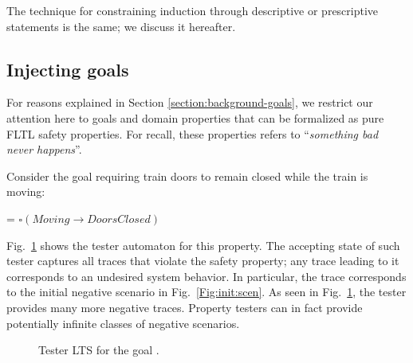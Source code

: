 The technique for constraining induction through descriptive or prescriptive statements is the same; we discuss it hereafter.


\subsection{Injecting goals\label{subsection:induction-pruning-with-goals}}

For reasons explained in Section \ref{section:background-goals}, we restrict our attention here to goals and domain properties that can be formalized as pure FLTL safety properties. For recall, these properties refers to  ``\emph{something bad never happens}''.

Consider the goal requiring train doors to remain closed while the train is moving:
\begin{center}
 = $\square(Moving \rightarrow DoorsClosed)$
\end{center}

Fig.~\ref{Fig.:tester-automaton-inductive} shows the tester automaton for this property. The accepting state of such tester captures all traces that violate the safety property; any trace leading to it corresponds to an undesired system behavior. In particular, the trace  corresponds to the initial negative scenario in Fig.~\ref{Fig:init:scen}. As seen in Fig.~\ref{Fig.:tester-automaton-inductive}, the tester provides many more negative traces. Property testers can in fact provide potentially infinite classes of negative scenarios.

\begin{figure}
\centering
{}
\caption{Tester LTS for the goal .\label{Fig.:tester-automaton-inductive}}
\end{figure}

